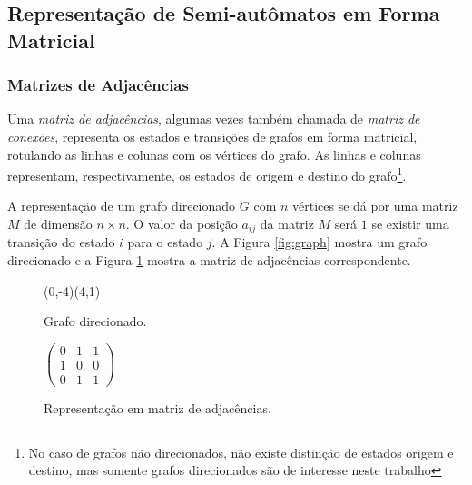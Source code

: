 \documentclass[12pt,a4paper]{article}
\begin{document}
\subsection{Representação de Semi-autômatos em Forma Matricial}

\subsubsection{Matrizes de Adjacências}

Uma \textit{matriz de adjacências}, algumas vezes também chamada de 
\textit{matriz de conexões}, representa os estados e transições de grafos
em forma matricial, rotulando as linhas e colunas com os vértices do grafo.
As linhas e colunas representam, respectivamente, os estados de origem e destino
do grafo\footnote{No caso de grafos não direcionados, não existe
distinção de estados origem e destino, mas somente grafos direcionados são 
de interesse neste trabalho}.

A representação de um grafo direcionado $G$ com $n$ vértices se dá por uma
matriz $M$ de dimensão $n \times n$. O valor da posição $a_{ij}$ da matriz
$M$ será $1$ se existir uma transição do estado $i$ para o estado $j$.
A Figura \ref{fig:graph} mostra um grafo direcionado e a Figura \ref{fig:adjm}
mostra a matriz de adjacências correspondente.

\begin{figure}[ht]
\begin{minipage}[b]{0.5\linewidth}
\begin{center}
\begin{VCPicture}{(0,-4)(4,1)}
 
  
 
\end{VCPicture}
\caption{Grafo direcionado.}
\label{fig:graph}
\end{center}
\end{minipage}
\hspace{0.5cm}
\begin{minipage}[b]{0.5\linewidth}
\begin{center}
\begin{math}
\begin{pmatrix}
0 & 1 & 1 \\
1 & 0 & 0 \\
0 & 1 & 1
\end{pmatrix}
\end{math}
\caption{Representação em matriz de adjacências.}
\label{fig:adjm}
\end{center}
\end{minipage}
\end{figure}
\end{document}
